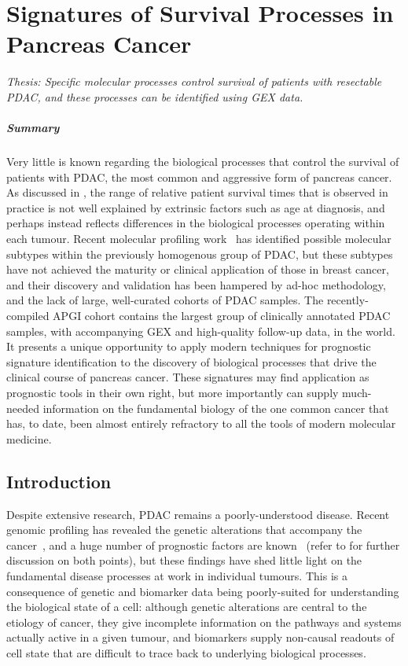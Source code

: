 \documentclass[dissertation.tex]{subfiles}
\begin{document}
\chapter{Signatures of Survival Processes in Pancreas Cancer}
\label{chap:signatures}

\emph{Thesis: Specific molecular processes control survival of patients with resectable \acrlong{PDAC}, and  these processes can be identified using \acrlong{GEX} data.}

\paragraph{Summary}Very little is known regarding the biological processes that control the survival of patients with \gls{PDAC}, the most common and aggressive form of pancreas cancer.  As discussed in , the range of relative patient survival times that is observed in practice is not well explained by extrinsic factors such as age at diagnosis, and perhaps instead reflects differences in the biological processes operating within each tumour.  Recent molecular profiling work~\cite{Collisson2011} has identified possible molecular subtypes within the previously homogenous group of \gls{PDAC}, but these subtypes have not achieved the maturity or clinical application of those in breast cancer, and their discovery and validation has been hampered by ad-hoc methodology, and the lack of large, well-curated cohorts of \gls{PDAC} samples.  The recently-compiled \gls{APGI} cohort contains the largest group of clinically annotated \gls{PDAC} samples, with accompanying \gls{GEX} and high-quality follow-up data, in the world.  It presents a unique opportunity to apply modern techniques for prognostic signature identification to the discovery of biological processes that drive the clinical course of pancreas cancer.  These signatures may find application as prognostic tools in their own right, but more importantly can supply much-needed information on the fundamental biology of the one common cancer that has, to date, been almost entirely refractory to all the tools of modern molecular medicine.

\section{Introduction}
Despite extensive research, \gls{PDAC} remains a poorly-understood disease.  Recent genomic profiling has revealed the genetic alterations that accompany the cancer~\cite{Biankin2012}, and a huge number of prognostic factors are known~\cite{Harsha2009} (refer to  for further discussion on both points), but these findings have shed little light on the fundamental disease processes at work in individual tumours.  This is a consequence of genetic and biomarker data being poorly-suited for understanding the biological state of a cell: although genetic alterations are central to the etiology of cancer, they give incomplete information on the pathways and systems actually active in a given tumour, and biomarkers supply non-causal readouts of cell state that are difficult to trace back to underlying biological processes.
\end{document}

